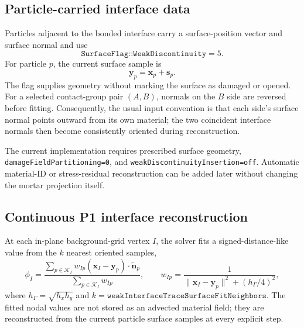 \subsection{Particle-carried interface data}

Particles adjacent to the bonded interface carry a surface-position vector and
surface normal and use
\begin{equation}
  \texttt{SurfaceFlag::WeakDiscontinuity}=5.
\end{equation}
For particle $p$, the current surface sample is
\begin{equation}
  \mathbf{y}_p = \mathbf{x}_p + \mathbf{s}_p.
  \label{eq:weak-trace-surface-sample}
\end{equation}
The flag supplies geometry without marking the surface as damaged or opened.
For a selected contact-group pair $(A,B)$, normals on the $B$ side are reversed
before fitting.  Consequently, the usual input convention is that each side's
surface normal points outward from its own material; the two coincident
interface normals then become consistently oriented during reconstruction.

The current implementation requires prescribed surface geometry,
\texttt{damageFieldPartitioning=0}, and
\texttt{weakDiscontinuityInsertion=off}.  Automatic material-ID or
stress-residual reconstruction can be added later without changing the mortar
projection itself.

\subsection{Continuous P1 interface reconstruction}

At each in-plane background-grid vertex $I$, the solver fits a
signed-distance-like value from the $k$ nearest oriented samples,
\begin{equation}
  \phi_I =
  \frac{\displaystyle\sum_{p\in\mathcal{K}_I}
    w_{Ip}(\mathbf{x}_I-\mathbf{y}_p)\mathbin{\cdot}\widetilde{\mathbf{n}}_p}
       {\displaystyle\sum_{p\in\mathcal{K}_I} w_{Ip}},
  \qquad
  w_{Ip} =
  \frac{1}{\lVert\mathbf{x}_I-\mathbf{y}_p\rVert^2+(h_\Gamma/4)^2},
  \label{eq:weak-trace-nodal-phi}
\end{equation}
where $h_\Gamma=\sqrt{h_xh_y}$ and
$k=\texttt{weakInterfaceTraceSurfaceFitNeighbors}$.  The fitted nodal values
are not stored as an advected material field; they are reconstructed from the
current particle surface samples at every explicit step.

